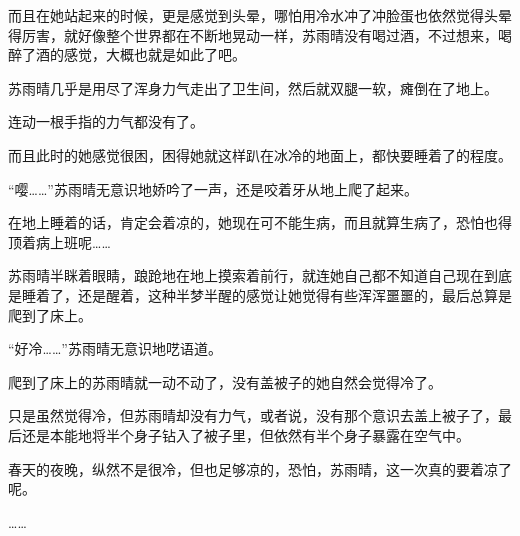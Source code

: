 而且在她站起来的时候，更是感觉到头晕，哪怕用冷水冲了冲脸蛋也依然觉得头晕得厉害，就好像整个世界都在不断地晃动一样，苏雨晴没有喝过酒，不过想来，喝醉了酒的感觉，大概也就是如此了吧。

苏雨晴几乎是用尽了浑身力气走出了卫生间，然后就双腿一软，瘫倒在了地上。

连动一根手指的力气都没有了。

而且此时的她感觉很困，困得她就这样趴在冰冷的地面上，都快要睡着了的程度。

“嘤……”苏雨晴无意识地娇吟了一声，还是咬着牙从地上爬了起来。

在地上睡着的话，肯定会着凉的，她现在可不能生病，而且就算生病了，恐怕也得顶着病上班呢……

苏雨晴半眯着眼睛，踉跄地在地上摸索着前行，就连她自己都不知道自己现在到底是睡着了，还是醒着，这种半梦半醒的感觉让她觉得有些浑浑噩噩的，最后总算是爬到了床上。

“好冷……”苏雨晴无意识地呓语道。

爬到了床上的苏雨晴就一动不动了，没有盖被子的她自然会觉得冷了。

只是虽然觉得冷，但苏雨晴却没有力气，或者说，没有那个意识去盖上被子了，最后还是本能地将半个身子钻入了被子里，但依然有半个身子暴露在空气中。

春天的夜晚，纵然不是很冷，但也足够凉的，恐怕，苏雨晴，这一次真的要着凉了呢。

……
